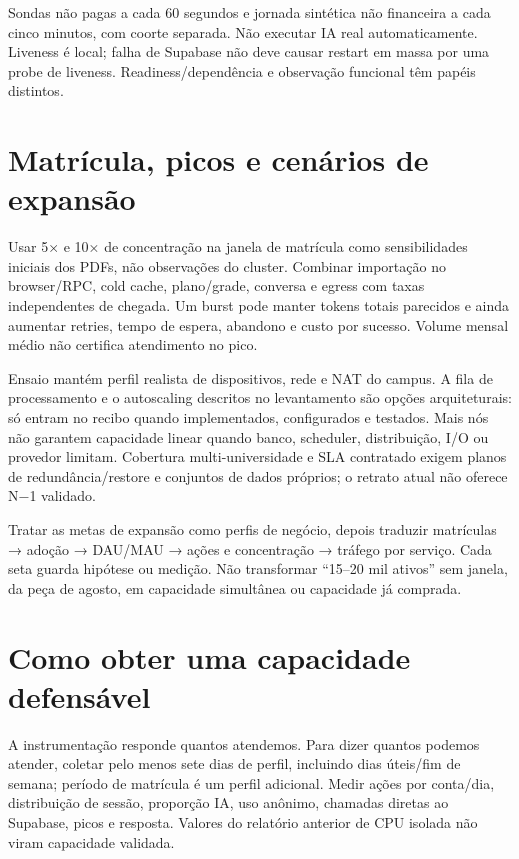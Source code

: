 \documentclass[10pt,a4paper]{article}
\begin{document}
Sondas não pagas a cada 60 segundos e jornada sintética não financeira a
cada cinco minutos, com coorte separada. Não executar IA real
automaticamente. Liveness é local; falha de Supabase não deve causar
restart em massa por uma probe de liveness. Readiness/dependência e
observação funcional têm papéis distintos.

\clearpage
\section{Matrícula, picos e cenários de
expansão}\label{matruxedcula-picos-e-cenuxe1rios-de-expansuxe3o}

Usar 5× e 10× de concentração na janela de matrícula como sensibilidades
iniciais dos PDFs, não observações do cluster. Combinar importação no
browser/RPC, cold cache, plano/grade, conversa e egress com taxas
independentes de chegada. Um burst pode manter tokens totais parecidos e
ainda aumentar retries, tempo de espera, abandono e custo por sucesso.
Volume mensal médio não certifica atendimento no pico.

Ensaio mantém perfil realista de dispositivos, rede e NAT do campus. A
fila de processamento e o autoscaling descritos no levantamento são
opções arquiteturais: só entram no recibo quando implementados,
configurados e testados. Mais nós não garantem capacidade linear quando
banco, scheduler, distribuição, I/O ou provedor limitam. Cobertura
multi-universidade e SLA contratado exigem planos de redundância/restore
e conjuntos de dados próprios; o retrato atual não oferece N−1 validado.

Tratar as metas de expansão como perfis de negócio, depois traduzir
matrículas → adoção → DAU/MAU → ações e concentração → tráfego por
serviço. Cada seta guarda hipótese ou medição. Não transformar ``15--20
mil ativos'' sem janela, da peça de agosto, em capacidade simultânea ou
capacidade já comprada.

\clearpage
\section{Como obter uma capacidade
defensável}\label{como-obter-uma-capacidade-defensuxe1vel}

A instrumentação responde quantos atendemos. Para dizer quantos podemos
atender, coletar pelo menos sete dias de perfil, incluindo dias
úteis/fim de semana; período de matrícula é um perfil adicional. Medir
ações por conta/dia, distribuição de sessão, proporção IA, uso anônimo,
chamadas diretas ao Supabase, picos e resposta. Valores do relatório
anterior de CPU isolada não viram capacidade validada.
\end{document}
